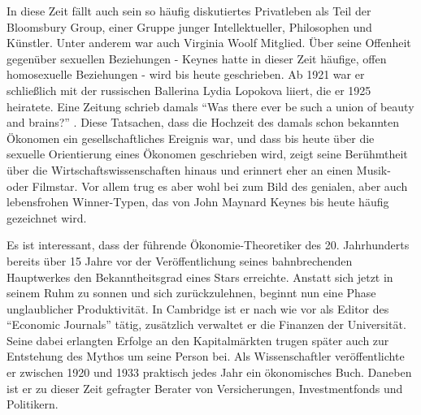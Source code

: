 In diese Zeit fällt auch sein so häufig diskutiertes Privatleben als Teil der Bloomsbury Group, einer Gruppe junger Intellektueller, Philosophen und Künstler. Unter anderem war auch Virginia Woolf Mitglied. Über seine Offenheit gegenüber sexuellen Beziehungen - Keynes hatte in dieser Zeit häufige, offen homosexuelle Beziehungen - wird bis heute geschrieben. Ab 1921 war er schließlich mit der russischen Ballerina Lydia Lopokova liiert, die er 1925 heiratete. Eine Zeitung schrieb damals "`Was there ever be such a union of beauty and brains?"' \parencite[S. 13]{Warsh}. Diese Tatsachen, dass die Hochzeit des damals schon bekannten Ökonomen ein gesellschaftliches Ereignis war, und dass bis heute über die sexuelle Orientierung eines Ökonomen geschrieben wird, zeigt seine Berühmtheit über die Wirtschaftswissenschaften hinaus und erinnert eher an einen Musik- oder Filmstar. Vor allem trug es aber wohl bei zum Bild des genialen, aber auch lebensfrohen Winner-Typen, das von John Maynard Keynes bis heute häufig gezeichnet wird.

Es ist interessant, dass der führende Ökonomie-Theoretiker des 20. Jahrhunderts bereits über 15 Jahre vor der Veröffentlichung seines bahnbrechenden Hauptwerkes den Bekanntheitsgrad eines Stars erreichte. Anstatt sich jetzt in seinem Ruhm zu sonnen und sich zurückzulehnen, beginnt nun eine Phase unglaublicher Produktivität. In Cambridge ist er nach wie vor als Editor des "`Economic Journals"' tätig, zusätzlich verwaltet er die Finanzen der Universität. Seine dabei erlangten Erfolge an den Kapitalmärkten trugen später auch zur Entstehung des Mythos um seine Person bei. Als Wissenschaftler veröffentlichte er zwischen 1920 und 1933 praktisch jedes Jahr ein ökonomisches Buch. Daneben ist er zu dieser Zeit gefragter Berater von Versicherungen, Investmentfonds und Politikern.

